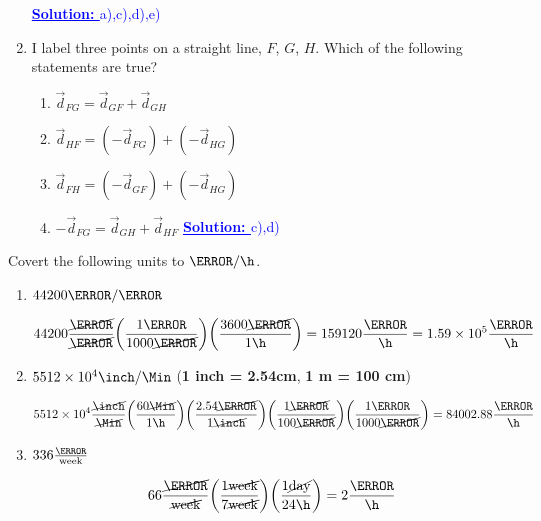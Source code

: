 \documentclass[12pt]{article} %
\begin{document}
\begin{qstn}[2]
\begin{enumerate}
			\textcolor{blue}{\textbf{\underline{Solution: }} a),c),d),e)}

		
		\item I label three points on a straight line, $F$, $G$, $H$. Which of the following statements are true?
			\begin{enumerate}[label = (\alph*)]
				\item $\vec d_{FG} = \vec d_{GF} + \vec d_{GH}$
				\item $\vec d_{HF} = (-\vec d_{FG}) + (-\vec d_{HG})$
				\item $\vec d_{FH} = (-\vec d_{GF}) + (-\vec d_{HG})$
				\item $-\vec d_{FG} = \vec d_{GH} + \vec d_{HF}$ \hspace*{4cm} \textcolor{blue}{\textbf{\underline{Solution: }} c),d)}
			\end{enumerate}

	\end{enumerate}
	
\end{qstn}

\begin{qstn}[3]
Covert the following units to $\km / \h$. 
\begin{enumerate}[label = (\alph*)]
	\item $44200 \m / \s$
	\begin{soln}
	$$ 44200 \frac{\cancel{\m}}{\cancel{\s}} \left(\frac{1 \km}{1000\cancel{\m}} \right) \left(\frac{3600 \cancel{\s}}{1\h} \right) = 159120 \frac{\km}{\h} = 1.59 \times 10^5 \frac{\km}{\h}$$
	\end{soln}


	\item $5512 \times 10^4 \inch / \Min$ \hspace*{6cm} (\textbf{1 inch = 2.54cm}, \textbf{1 m = 100 cm})
	\begin{soln}
	$$5512 \times 10^4 \frac{\cancel{\inch}}{\cancel{\Min}} \left(\frac{60 \cancel{\Min}}{1 \h} \right) \left(\frac{2.54 \cancel{\cm}}{1 \cancel{\inch}} \right) \left(\frac{1 \cancel{\m}}{100 \cancel{\cm}} \right) \left(\frac{1\km }{1000 \cancel{\m}} \right) = 84002.88 \frac{\km}{\h}$$
	\end{soln}


	\item $336 \frac{\km}{\text{week}}$
	\begin{soln}
	$$66 \frac{\cancel{\km}}{\cancel{\text{week}}} \left(\frac{1 \cancel{\text{week}}}{7 \cancel{\text{week}}} \right) \left(\frac{1 \cancel{\text{day}}}{24 \h} \right) = 2 \frac{\km}{\h} $$
	\end{soln}



\end{enumerate}


\end{qstn}
\end{document}
